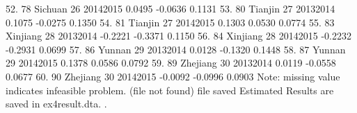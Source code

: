 52. {\VBAR}  78        Sichuan   26   2014{\tytilde}2015    0.0495   -0.0636   0.1131 {\VBAR}
 53. {\VBAR}  80        Tianjin   27   2013{\tytilde}2014    0.1075   -0.0275   0.1350 {\VBAR}
 54. {\VBAR}  81        Tianjin   27   2014{\tytilde}2015    0.1303    0.0530   0.0774 {\VBAR}
 55. {\VBAR}  83       Xinjiang   28   2013{\tytilde}2014   -0.2221   -0.3371   0.1150 {\VBAR}
 56. {\VBAR}  84       Xinjiang   28   2014{\tytilde}2015   -0.2232   -0.2931   0.0699 {\VBAR}
 57. {\VBAR}  86         Yunnan   29   2013{\tytilde}2014    0.0128   -0.1320   0.1448 {\VBAR}
 58. {\VBAR}  87         Yunnan   29   2014{\tytilde}2015    0.1378    0.0586   0.0792 {\VBAR}
 59. {\VBAR}  89       Zhejiang   30   2013{\tytilde}2014    0.0119   -0.0558   0.0677 {\VBAR}
 60. {\VBAR}  90       Zhejiang   30   2014{\tytilde}2015   -0.0092   -0.0996   0.0903 {\VBAR}
     {\BLC}
Note: missing value indicates infeasible problem.
(file{} not found)
file{} saved
{\smallskip}
Estimated Results are saved in ex4result.dta.
{\smallskip}
. 
